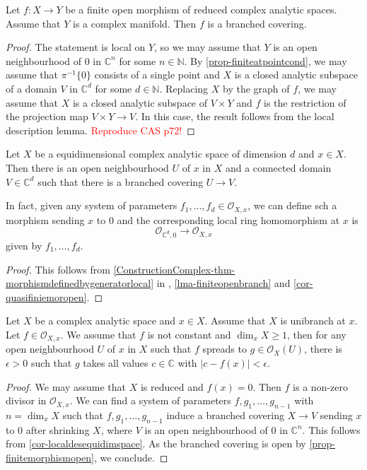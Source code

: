 \begin{lemma}\label{lma-finiteopenbranch}
    Let $f:X\rightarrow Y$ be a finite open morphism of reduced complex analytic spaces. Assume that $Y$ is a complex manifold. Then $f$ is a branched covering.
\end{lemma}
\begin{proof}
    The statement is local on $Y$, so we may assume that $Y$ is an open neighbourhood of $0$ in $\mathbb{C}^n$ for some $n\in \mathbb{N}$. By \cref{prop-finiteatpointcond}, we may assume that $\pi^{-1}\{0\}$ consists of a single point and $X$ is a closed analytic subspace of a domain $V$ in $\mathbb{C}^d$ for some $d\in \mathbb{N}$. Replacing $X$ by the graph of $f$, we may assume that $X$ is a closed analytic subspace of $V\times Y$ and $f$ is the restriction of the projection map $V\times Y\rightarrow V$.  In this case, the result follows from the local description lemma. \textcolor{red}{Reproduce CAS p72!} 
\end{proof}
\begin{corollary}\label{cor-localdesequidimspace}
    Let $X$ be a equidimensional complex analytic space of dimension $d$ and $x\in X$. Then there is an open neighbourhood $U$ of $x$ in $X$ and a connected domain $V\in \mathbb{C}^d$  such that there is a branched covering $U\rightarrow V$.

    In fact, given any system of parameters $f_1,\ldots,f_d\in \mathcal{O}_{X,x}$, we can define sch a morphism sending $x$ to $0$ and the corresponding local ring homomorphism at $x$ is 
    \[
        \mathcal{O}_{\mathbb{C}^d,0}\rightarrow \mathcal{O}_{X,x}  
    \]
    given by $f_1,\ldots,f_d$.
\end{corollary}
\begin{proof}
    This follows from \cref{ConstructionComplex-thm-morphismdefinedbygeneratorlocal} in , \cref{lma-finiteopenbranch} and \cref{cor-quasifiniemoropen}.
\end{proof}


\begin{corollary}\label{cor-takeallvalues}
    Let $X$ be a complex analytic space and $x\in X$. Assume that $X$ is unibranch at $x$. Let $f\in \mathcal{O}_{X,x}$. We assume that $f$ is not constant and $\dim_x X\geq 1$, then for any open neighbourhood $U$ of $x$ in $X$ such that $f$ spreads to $g\in \mathcal{O}_X(U)$, there is $\epsilon>0$ such that $g$ takes all values $c\in \mathbb{C}$ with $|c-f(x)|<\epsilon$.
\end{corollary}
\begin{proof}
    We may assume that $X$ is reduced and $f(x)=0$. Then $f$ is a non-zero divisor in $\mathcal{O}_{X,x}$. We can find a system of parameters $f,g_1,\ldots,g_{n-1}$ with $n=\dim_x X$ such that $f,g_1,\ldots,g_{n-1}$ induce a branched covering $X\rightarrow V$ sending $x$ to $0$ after shrinking $X$, where $V$ is an open neighbourhood of $0$ in $\mathbb{C}^n$. This follows from \cref{cor-localdesequidimspace}. As the branched covering is open by \cref{prop-finitemorphismopen}, we conclude.
\end{proof}

